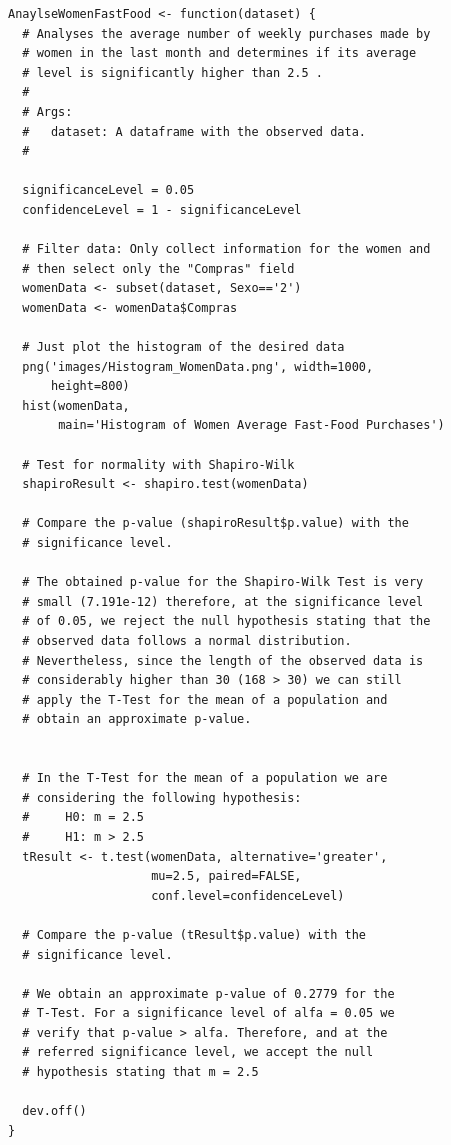\documentclass[12pt]{article}
\begin{document}
\begin{lstlisting}
AnaylseWomenFastFood <- function(dataset) {
  # Analyses the average number of weekly purchases made by
  # women in the last month and determines if its average
  # level is significantly higher than 2.5 .
  #
  # Args:
  #   dataset: A dataframe with the observed data.
  #
  
  significanceLevel = 0.05
  confidenceLevel = 1 - significanceLevel

  # Filter data: Only collect information for the women and
  # then select only the "Compras" field
  womenData <- subset(dataset, Sexo=='2')
  womenData <- womenData$Compras

  # Just plot the histogram of the desired data
  png('images/Histogram_WomenData.png', width=1000,
      height=800)
  hist(womenData,
       main='Histogram of Women Average Fast-Food Purchases')

  # Test for normality with Shapiro-Wilk
  shapiroResult <- shapiro.test(womenData)
  
  # Compare the p-value (shapiroResult$p.value) with the
  # significance level.
  
  # The obtained p-value for the Shapiro-Wilk Test is very
  # small (7.191e-12) therefore, at the significance level
  # of 0.05, we reject the null hypothesis stating that the
  # observed data follows a normal distribution.
  # Nevertheless, since the length of the observed data is
  # considerably higher than 30 (168 > 30) we can still
  # apply the T-Test for the mean of a population and
  # obtain an approximate p-value.


  # In the T-Test for the mean of a population we are
  # considering the following hypothesis:
  #     H0: m = 2.5
  #     H1: m > 2.5
  tResult <- t.test(womenData, alternative='greater',
                    mu=2.5, paired=FALSE,
                    conf.level=confidenceLevel)
  
  # Compare the p-value (tResult$p.value) with the
  # significance level.

  # We obtain an approximate p-value of 0.2779 for the
  # T-Test. For a significance level of alfa = 0.05 we
  # verify that p-value > alfa. Therefore, and at the
  # referred significance level, we accept the null
  # hypothesis stating that m = 2.5

  dev.off()
}
\end{lstlisting}
\end{document}
